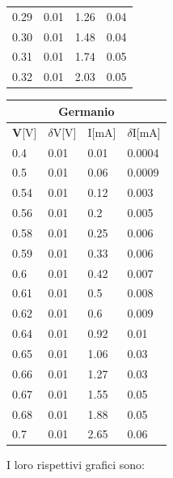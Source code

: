\documentclass{amsart}
\begin{document}
\begin{center}
\begin{tabular}{|p{1cm}|p{1cm}|p{1cm}|p{1cm}|}
            0.29 & 0.01 & 1.26 & 0.04\\
            0.30 & 0.01 & 1.48 & 0.04\\
            0.31 & 0.01 & 1.74 & 0.05\\
            0.32 & 0.01 & 2.03 & 0.05\\
            \hline      
        \end{tabular}
        \hspace{2cm}
        \begin{tabular}{|p{1cm}|p{1cm}|p{1cm}|p{1cm}|}
            \hline
            \multicolumn{4}{|c|}{Germanio}\\
            \hline
            \textbf V[V] & $\delta$V[V] & I[mA] & $\delta$I[mA] \\
            \hline
            0.4 & 0.01 & 0.01 & 0.0004\\
            0.5 & 0.01 & 0.06 & 0.0009\\
            0.54 & 0.01 & 0.12 & 0.003\\
            0.56 & 0.01 & 0.2 & 0.005\\
            0.58 & 0.01 & 0.25 & 0.006\\
            0.59 & 0.01 & 0.33 & 0.006\\
            0.6 & 0.01 & 0.42 & 0.007\\
            0.61 & 0.01 & 0.5 & 0.008\\
            0.62 & 0.01 & 0.6 & 0.009\\
            0.64 & 0.01 & 0.92 & 0.01\\
            0.65 & 0.01 & 1.06 & 0.03\\
            0.66 & 0.01 & 1.27 & 0.03\\
            0.67 & 0.01 & 1.55 & 0.05\\
            0.68 & 0.01 & 1.88 & 0.05\\
            0.7 & 0.01 & 2.65 & 0.06\\
            \hline
        \end{tabular}
    \end{center}
    I loro rispettivi grafici sono:\\
    \hfill \\
\end{document}
